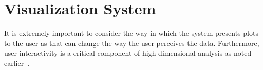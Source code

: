 \chapter{Visualization System \label{ch:visualizer}}

It is extremely important to consider the way in which the system presents plots to the user as that can change the way the user perceives the data. Furthermore, user interactivity is a critical component of high dimensional analysis as noted earlier~\cite{lius2016}.





